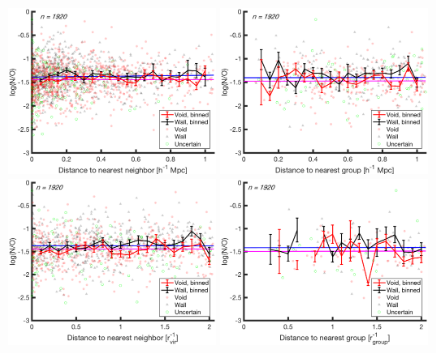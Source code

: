 \begin{figure}
    \includegraphics[width=0.49\textwidth]{Images/smallScaleEnvironment/1sig_dwarf_I06relations_absDist_NO}
    \includegraphics[width=0.49\textwidth]{Images/smallScaleEnvironment/1sig_dwarf_I06relations_groupAbsDist_NO}
    \includegraphics[width=0.49\textwidth]{Images/smallScaleEnvironment/1sig_dwarf_I06relations_virDist_NO}
    \includegraphics[width=0.49\textwidth]{Images/smallScaleEnvironment/1sig_dwarf_I06relations_groupRDist_NO}

\end{figure}
